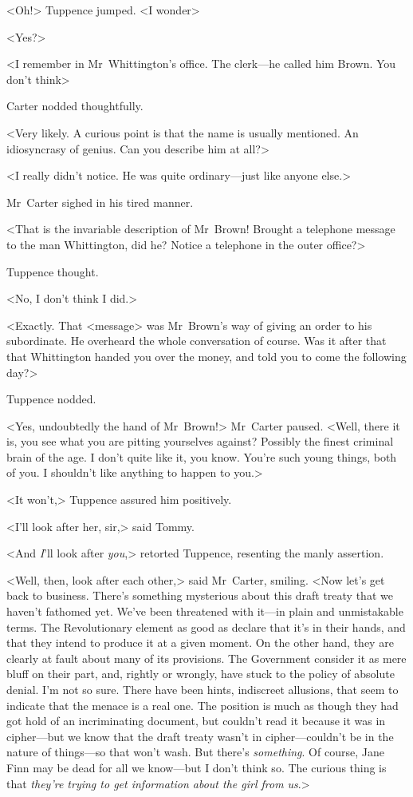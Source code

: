<Oh!> Tuppence jumped. <I wonder\longdash>

<Yes?>

<I remember in Mr~Whittington's office. The clerk—he called him Brown. You don't think\longdash>

Carter nodded thoughtfully.

<Very likely. A curious point is that the name is usually mentioned. An idiosyncrasy of genius. Can you describe him at all?>

<I really didn't notice. He was quite ordinary—just like anyone else.>

Mr~Carter sighed in his tired manner.

<That is the invariable description of Mr~Brown! Brought a telephone message to the man Whittington, did he? Notice a telephone in the outer office?>

Tuppence thought.

<No, I don't think I did.>

<Exactly. That <message> was Mr~Brown's way of giving an order to his subordinate. He overheard the whole conversation of course. Was it after that that Whittington handed you over the money, and told you to come the following day?>

Tuppence nodded.

<Yes, undoubtedly the hand of Mr~Brown!> Mr~Carter paused. <Well, there it is, you see what you are pitting yourselves against? Possibly the finest criminal brain of the age. I don't quite like it, you know. You're such young things, both of you. I shouldn't like anything to happen to you.>

<It won't,> Tuppence assured him positively.

<I'll look after her, sir,> said Tommy.

<And \emph{I}'ll look after \emph{you},> retorted Tuppence, resenting the manly assertion.

<Well, then, look after each other,> said Mr~Carter, smiling. <Now let's get back to business. There's something mysterious about this draft treaty that we haven't fathomed yet. We've been threatened with it—in plain and unmistakable terms. The Revolutionary element as good as declare that it's in their hands, and that they intend to produce it at a given moment. On the other hand, they are clearly at fault about many of its provisions. The Government consider it as mere bluff on their part, and, rightly or wrongly, have stuck to the policy of absolute denial. I'm not so sure. There have been hints, indiscreet allusions, that seem to indicate that the menace is a real one. The position is much as though they had got hold of an incriminating document, but couldn't read it because it was in cipher—but we know that the draft treaty wasn't in cipher—couldn't be in the nature of things—so that won't wash. But there's \emph{something}. Of course, Jane Finn may be dead for all we know—but I don't think so. The curious thing is that \emph{they're trying to get information about the girl from us}.>

